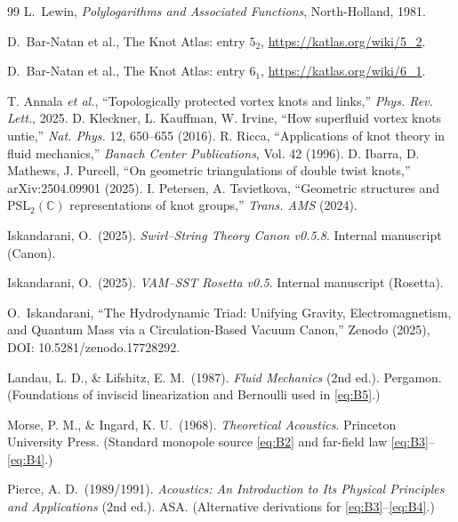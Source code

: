 \begin{thebibliography}{99}
    L.~Lewin,
    \newblock \emph{Polylogarithms and Associated Functions},
    \newblock North-Holland, 1981.

    D.~Bar-Natan et al.,
    \newblock The Knot Atlas: entry \(5_2\),
    \newblock \url{https://katlas.org/wiki/5_2}.

    D.~Bar-Natan et al.,
    \newblock The Knot Atlas: entry \(6_1\),
    \newblock \url{https://katlas.org/wiki/6_1}.

     T. Annala \emph{et al.}, ``Topologically protected vortex knots and links,'' \emph{Phys. Rev. Lett.}, 2025.
     D. Kleckner, L. Kauffman, W. Irvine, ``How superfluid vortex knots untie,'' \emph{Nat. Phys.} 12, 650–655 (2016).
     R. Ricca, ``Applications of knot theory in fluid mechanics,'' \emph{Banach Center Publications}, Vol. 42 (1996).
     D. Ibarra, D. Mathews, J. Purcell, ``On geometric triangulations of double twist knots,'' arXiv:2504.09901 (2025).
     I. Petersen, A. Tsvietkova, ``Geometric structures and PSL$_2(\mathbb{C})$ representations of knot groups,'' \emph{Trans. AMS} (2024).


    Iskandarani, O.\ (2025).
    \emph{Swirl–String Theory Canon v0.5.8}.
    Internal manuscript (Canon).

    Iskandarani, O.\ (2025).
    \emph{VAM–SST Rosetta v0.5}.
    Internal manuscript (Rosetta).

    O.~Iskandarani,
    ``The Hydrodynamic Triad: Unifying Gravity, Electromagnetism, and Quantum Mass
    via a Circulation-Based Vacuum Canon,''
    Zenodo (2025), DOI: 10.5281/zenodo.17728292.

    Landau, L. D., \& Lifshitz, E. M.\ (1987).
    \emph{Fluid Mechanics} (2nd ed.). Pergamon.
    (Foundations of inviscid linearization and Bernoulli used in \eqref{eq:B5}.)

    Morse, P. M., \& Ingard, K. U.\ (1968).
    \emph{Theoretical Acoustics}. Princeton University Press.
    (Standard monopole source \eqref{eq:B2} and far-field law \eqref{eq:B3}–\eqref{eq:B4}.)

    Pierce, A. D.\ (1989/1991).
    \emph{Acoustics: An Introduction to Its Physical Principles and Applications} (2nd ed.). ASA.
    (Alternative derivations for \eqref{eq:B3}–\eqref{eq:B4}.)


\end{thebibliography}
